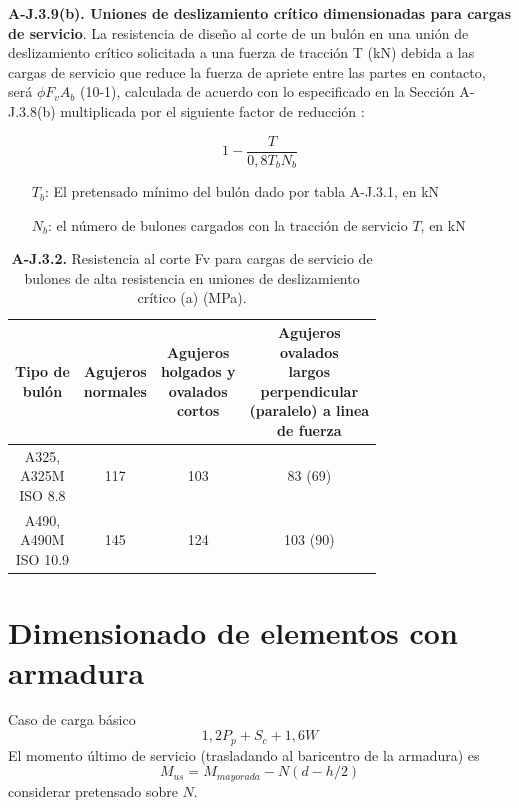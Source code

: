 \documentclass[twocolumn]{article}
\begin{document}
\textbf{A-J.3.9(b). Uniones de deslizamiento crítico dimensionadas para cargas de servicio}.
La resistencia de diseño al corte de un bulón en una unión de deslizamiento crítico
solicitada a una fuerza de tracción T (kN) debida a las cargas de servicio que reduce la
fuerza de apriete entre las partes en contacto, será $\phi F_v A_b$ (10-1), calculada de acuerdo con
lo especificado en la Sección A-J.3.8(b) multiplicada por el siguiente factor de reducción :

 \[
 1 - \frac{T}{0,8T_b N_b}
 \]
 
 \begin{itemize}
 	\item[$T_b$:] El pretensado mínimo del bulón dado por tabla A-J.3.1, en kN
 	\item[$N_b$:] el número de bulones cargados con la tracción de servicio $T$, en kN
 \end{itemize}




\begin{table}[htb!]
	\centering
	\caption{\textbf{A-J.3.2.} Resistencia al corte Fv para cargas de servicio de bulones de alta
		resistencia en uniones de deslizamiento crítico (a) (MPa).}
	\footnotesize
	\begin{tabular}{|c|c|c|c|}
		\hline 
		\thead{Tipo de \\ bulón}&\thead{Agujeros\\normales}  & \thead{Agujeros\\holgados y\\ovalados\\ cortos} & \thead{Agujeros\\ ovalados\\ largos\\perpendicular\\ (paralelo) a linea\\ de fuerza} \\ 
		\hline 
		\thead{A325,\\ A325M\\ISO 8.8}	& 117 & 103 & 83 (69) \\ 
		\hline 
		\thead{A490,\\ A490M\\ISO 10.9}	& 145 & 124 & 103 (90)  \\ 
		\hline 
	\end{tabular} 
\end{table}




\clearpage
\section{Dimensionado de elementos con armadura}
Caso de carga básico
\[
1,2P_p +S_c + 1,6W
\]
El momento último de servicio (trasladando al baricentro de la armadura) es
\[
M_{us} = M_{mayorada} - N(d-h/2)
\]
considerar pretensado sobre $N$.
\end{document}
